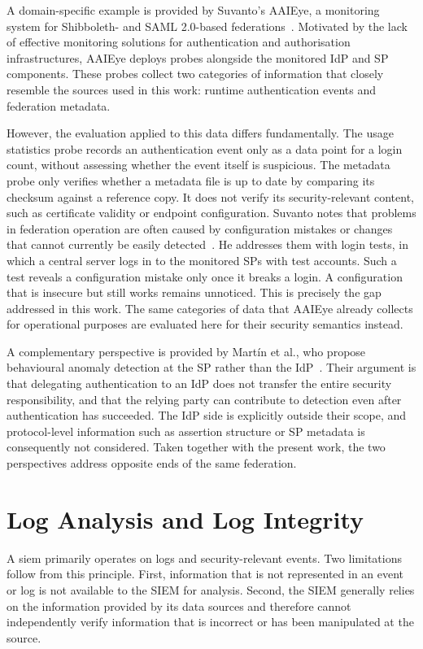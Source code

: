 \documentclass[../main.tex]{subfiles}
\begin{document}
A domain-specific example is provided by Suvanto's AAIEye, a monitoring system for Shibboleth- 
and SAML 2.0-based federations~\cite{MonitoringAAI}. 
Motivated by the lack of effective monitoring solutions for authentication and authorisation 
infrastructures, AAIEye deploys probes alongside the monitored IdP and SP components. 
These probes collect two categories of information that closely resemble the sources used in this 
work: runtime authentication events and federation metadata. 

However, the evaluation applied to this data differs fundamentally. 
The usage statistics probe records an authentication event only as a data point for a login count, 
without assessing whether the event itself is suspicious. 
The metadata probe only verifies whether a metadata file is up to date by comparing its checksum 
against a reference copy. 
It does not verify its security-relevant content, such as certificate validity or endpoint 
configuration. 
Suvanto notes that problems in federation operation are often caused by configuration mistakes or 
changes that cannot currently be easily detected~\cite{MonitoringAAI}. 
He addresses them with login tests, in which a central server logs in to the monitored SPs 
with test accounts. 
Such a test reveals a configuration mistake only once it breaks a login. 
A configuration that is insecure but still works remains unnoticed. 
This is precisely the gap addressed in this work. 
The same categories of data that AAIEye already collects for operational purposes are evaluated 
here for their security semantics instead. 

A complementary perspective is provided by Martín et al., who propose 
behavioural anomaly detection at the SP rather than the IdP~\cite{UEBAFederation}. 
Their argument is that delegating authentication to an IdP does not transfer the entire security 
responsibility, and that the relying party can contribute to detection even after authentication 
has succeeded. 
The IdP side is explicitly outside their scope, and protocol-level information such as assertion 
structure or SP metadata is consequently not considered. 
Taken together with the present work, the two perspectives address opposite ends of the 
same federation.

\section{Log Analysis and Log Integrity}\label{sec:why-not-siem}

A \gls{siem} primarily operates on logs and security-relevant events. 
Two limitations follow from this principle. 
First, information that is not represented in an event or log is not available to the SIEM for 
analysis. 
Second, the SIEM generally relies on the information provided by its data sources and therefore 
cannot independently verify information that is incorrect or has been manipulated at the source. 
\end{document}
